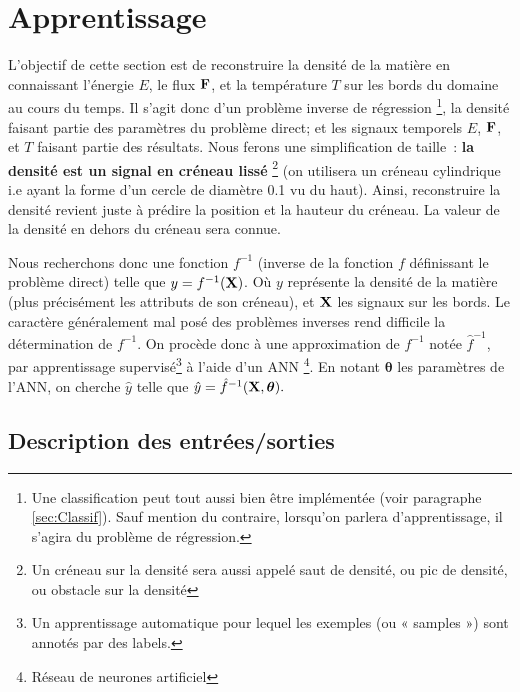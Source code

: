 
\chapter{Apprentissage} %

\label{Chapter4} %

L'objectif de cette section est de reconstruire la densité de la matière en connaissant l'énergie $E$, le flux $\mathbf{F}$, et la température $T$ sur les bords du domaine au cours du temps. Il s'agit donc d'un problème inverse de régression \footnote{Une classification peut tout aussi bien être implémentée (voir paragraphe \ref{sec:Classif}). Sauf mention du contraire, lorsqu'on parlera d'apprentissage, il s'agira du problème de régression.}, la densité faisant partie des paramètres du problème direct; et les signaux temporels $E$, $\mathbf{F}$, et $T$ faisant partie des résultats. Nous ferons une simplification de taille : \textbf{la densité est un signal en créneau lissé} \footnote{Un créneau sur la densité sera aussi appelé saut de densité, ou pic de densité, ou obstacle sur la densité} (on utilisera un créneau cylindrique i.e ayant la forme d'un cercle de diamètre 0.1 vu du haut). Ainsi, reconstruire la densité revient juste à prédire la position et la hauteur du créneau. La valeur de la densité en dehors du créneau sera connue. 

Nous recherchons donc une fonction $f^{-1}$ (inverse de la fonction $f$ définissant le problème direct) telle que $y = f^{-1}(\mathbf{X})$. Où $y$ représente la densité de la matière (plus précisément les attributs de son créneau), et $\mathbf{X}$ les signaux sur les bords. Le caractère généralement mal posé des problèmes inverses rend difficile la détermination de $f^{-1}$. On procède donc à une approximation de $f^{-1}$ notée $\hat{f}^{-1}$, par apprentissage supervisé\footnote{Un apprentissage automatique pour lequel les exemples (ou « samples ») sont annotés par des labels.} à l'aide d'un ANN \footnote{Réseau de neurones artificiel}. En notant $\bm{\theta}$ les paramètres de l'ANN, on cherche $\hat{y}$ telle que $ \hat{y} = \hat{f}^{-1}(\mathbf{X}, \bm{\theta}). $


\section{Description des entrées/sorties}

